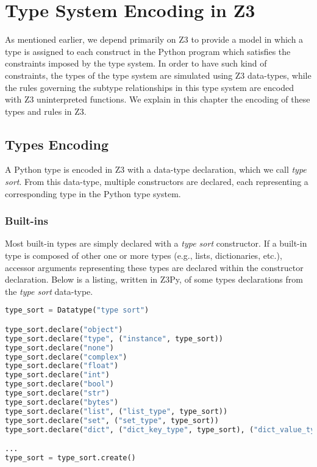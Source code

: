 
\chapter{Type System Encoding in Z3}\label{chapter:ts}
As mentioned earlier, we depend primarily on Z3 to provide a model in which a type is assigned to each construct in the Python program which satisfies the constraints imposed by the type system. In order to have such kind of constraints, the types of the type system are simulated using Z3 data-types, while the rules governing the subtype relationships in this type system are encoded with Z3 uninterpreted functions. We explain in this chapter the encoding of these types and rules in Z3.
\section{Types Encoding}
A Python type is encoded in Z3 with a data-type declaration, which we call \textit{type sort}. From this data-type, multiple constructors are declared, each representing a corresponding type in the Python type system.\\

\subsection{Built-ins}
Most built-in types are simply declared with a \textit{type sort} constructor. If a built-in type is composed of other one or more types (e.g., lists, dictionaries, etc.), accessor arguments representing these types are declared within the constructor declaration. Below is a listing, written in Z3Py, of some types declarations from the \textit{type sort} data-type.

\begin{lstlisting}[language=python]
type_sort = Datatype("type sort")

type_sort.declare("object")
type_sort.declare("type", ("instance", type_sort))
type_sort.declare("none")
type_sort.declare("complex")
type_sort.declare("float")
type_sort.declare("int")
type_sort.declare("bool")
type_sort.declare("str")
type_sort.declare("bytes")
type_sort.declare("list", ("list_type", type_sort))
type_sort.declare("set", ("set_type", type_sort))
type_sort.declare("dict", ("dict_key_type", type_sort), ("dict_value_type", type_sort))

...
type_sort = type_sort.create()
\end{lstlisting}

